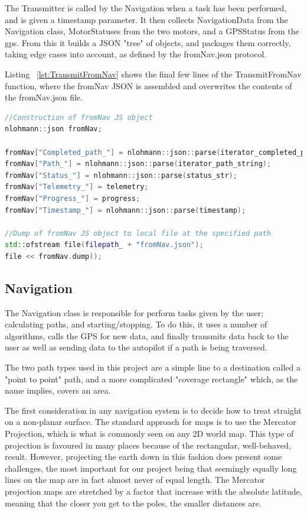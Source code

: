 The Transmitter is called by the Navigation when a task has been performed, and is given a timestamp parameter. It then collects NavigationData from the Navigation class, MotorStatuses from the two motors, and a GPSStatus from the gps. From this it builds a JSON "tree" of objects, and packages them correctly, taking edge cases into account, as defined by the fromNav.json protocol. 

Listing ~\ref{lst:TransmitFromNav} shows the final few lines of the TransmitFromNav function, where the fromNav JSON is assembled and overwrites the contents of the fromNav.json file.

\begin{lstlisting}[caption = {Last lines of the TransmitFromNav function in the Transmitter class}, captionpos=b, label={lst:TransmitFromNav}, language=C++,firstnumber=1]
//Construction of fromNav JS object
nlohmann::json fromNav;

fromNav["Completed_path_"] = nlohmann::json::parse(iterator_completed_path_string);
fromNav["Path_"] = nlohmann::json::parse(iterator_path_string);
fromNav["Status_"] = nlohmann::json::parse(status_str);
fromNav["Telemetry_"] = telemetry;
fromNav["Progress_"] = progress;
fromNav["Timestamp_"] = nlohmann::json::parse(timestamp);

//Dump of fromNav JS object to local file at the specified path
std::ofstream file(filepath_ + "fromNav.json");
file << fromNav.dump();
\end{lstlisting}

\subsection{Navigation}
The Navigation class is responsible for perform tasks given by the user; calculating paths, and starting/stopping. To do this, it uses a number of algorithms, calls the GPS for new data, and finally transmits data back to the user as well as sending data to the autopilot if a path is being traversed.

The two path types used in this project are a simple line to a destination called a "point to point" path, and a more complicated "coverage rectangle" which, as the name implies, covers an area.

The first consideration in any navigation system is to decide how to treat straight on a non-planar surface. The standard approach for maps is to use the Mercator Projection, which is what is commonly seen on any 2D world map. This type of projection is favoured in many places because of the rectangular, well-behaved, result. However, projecting the earth down in this fashion does present some challenges, the most important for our project being that seemingly equally long lines on the map are in fact almost never of equal length. The Mercator projection maps are stretched by a factor that increase with the absolute latitude, meaning that the closer you get to the poles, the smaller distances are.

